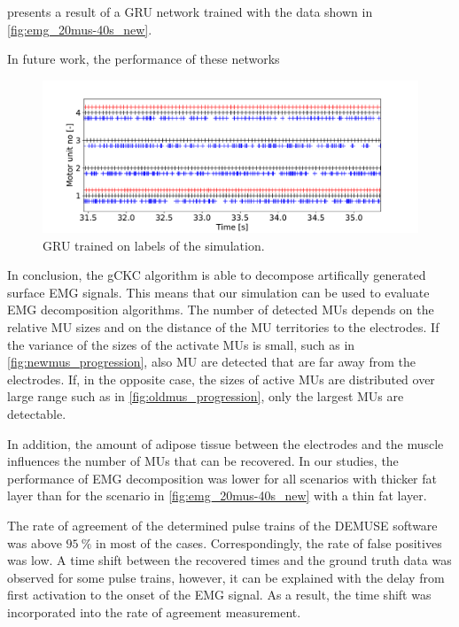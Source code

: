  presents a result of a GRU network trained with the data shown in \cref{fig:emg_20mus-40s_new}.


In future work, the performance of these networks 


\begin{figure}
  \centering%
  \includegraphics[width=\textwidth]{images/results/application/gru1.pdf}%
  \caption{GRU trained on labels of the simulation.}%
  \label{fig:gru_result}%
\end{figure}



In conclusion, the gCKC algorithm is able to decompose artifically generated surface EMG signals. This means that our simulation can be used to evaluate EMG decomposition algorithms. The number of detected MUs depends on the relative MU sizes and on the distance of the MU territories to the electrodes. If the variance of the sizes of the activate MUs is small, such as in \cref{fig:newmus_progression}, also MU are detected that are far away from the electrodes. If, in the opposite case, the sizes of active MUs are distributed over large range such as in \cref{fig:oldmus_progression}, only the largest MUs are detectable.

In addition, the amount of adipose tissue between the electrodes and the muscle influences the number of MUs that can be recovered. In our studies, the performance of EMG decomposition was lower for all scenarios with thicker fat layer than for the scenario in \cref{fig:emg_20mus-40s_new} with a thin fat layer.

The rate of agreement of the determined pulse trains of the DEMUSE software was above $\SI{95}{\percent}$ in most of the cases. Correspondingly, the rate of false positives was low.
A time shift between the recovered times and the ground truth data was observed for some pulse trains, however, it can be explained with the delay from first activation to the onset of the EMG signal. As a result, the time shift was incorporated into the rate of agreement measurement.



